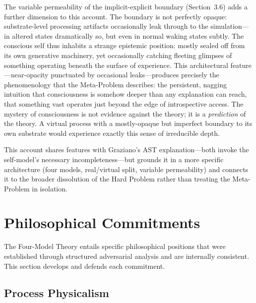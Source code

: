 \documentclass[12pt]{article}
\begin{document}
The variable permeability of the implicit-explicit boundary (Section~3.6) adds a further dimension to this account. The boundary is not perfectly opaque: substrate-level processing artifacts occasionally leak through to the simulation---\hspace{0pt}in altered states dramatically so, but even in normal waking states subtly. The conscious self thus inhabits a strange epistemic position: mostly sealed off from its own generative machinery, yet occasionally catching fleeting glimpses of something operating beneath the surface of experience. This architectural feature---\hspace{0pt}near-opacity punctuated by occasional leaks---\hspace{0pt}produces precisely the phenomenology that the Meta-Problem describes: the persistent, nagging intuition that consciousness is somehow deeper than any explanation can reach, that something vast operates just beyond the edge of introspective access. The mystery of consciousness is not evidence against the theory; it is a \emph{prediction} of the theory. A virtual process with a mostly-opaque but imperfect boundary to its own substrate would experience exactly this sense of irreducible depth.

This account shares features with Graziano's AST explanation---\hspace{0pt}both invoke the self-model's necessary incompleteness---\hspace{0pt}but grounds it in a more specific architecture (four models, real/virtual split, variable permeability) and connects it to the broader dissolution of the Hard Problem rather than treating the Meta-Problem in isolation.



\section{Philosophical Commitments}

The Four-Model Theory entails specific philosophical positions that were established through structured adversarial analysis and are internally consistent. This section develops and defends each commitment.


\subsection{Process Physicalism}
\end{document}
